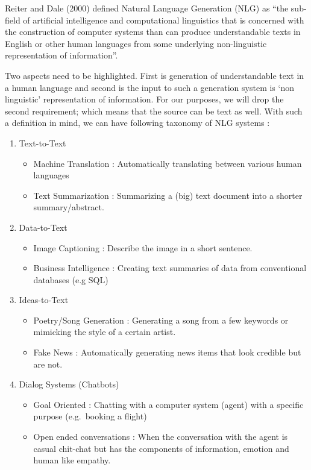 \documentclass[]{krantz}
\providecommand{\tightlist}{%
  \setlength{\itemsep}{0pt}\setlength{\parskip}{0pt}}
\begin{document}
Reiter and Dale (2000) defined Natural Language Generation (NLG) as ``the sub-field of artificial intelligence and computational linguistics that is concerned with the construction of computer systems than can produce understandable texts in English or other human languages from some underlying non-linguistic representation of information''.

Two aspects need to be highlighted. First is generation of understandable text in a human language and second is the input to such a generation system is `non linguistic' representation of information. For our purposes, we will drop the second requirement; which means that the source can be text as well. With such a definition in mind, we can have following taxonomy of NLG systems :

\begin{enumerate}
\def\labelenumi{\arabic{enumi}.}
\tightlist
\item
  Text-to-Text

  \begin{itemize}
  \tightlist
  \item
    Machine Translation : Automatically translating between various human languages
  \item
    Text Summarization : Summarizing a (big) text document into a shorter summary/abstract.
  \end{itemize}
\item
  Data-to-Text

  \begin{itemize}
  \tightlist
  \item
    Image Captioning : Describe the image in a short sentence.
  \item
    Business Intelligence : Creating text summaries of data from conventional databases (e.g SQL)
  \end{itemize}
\item
  Ideas-to-Text

  \begin{itemize}
  \tightlist
  \item
    Poetry/Song Generation : Generating a song from a few keywords or mimicking the style of a certain artist.
  \item
    Fake News : Automatically generating news items that look credible but are not.
  \end{itemize}
\item
  Dialog Systems (Chatbots)

  \begin{itemize}
  \tightlist
  \item
    Goal Oriented : Chatting with a computer system (agent) with a specific purpose (e.g.~booking a flight)
  \item
    Open ended conversations : When the conversation with the agent is casual chit-chat but has the components of information, emotion and human like empathy.
  \end{itemize}
\end{enumerate}
\end{document}
